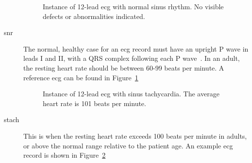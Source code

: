 \documentclass[\main/thesis.tex]{subfiles}
\begin{document}
\begin{description}
    \begin{figure}[ht]
        \centering
        \caption{Instance of 12-lead \gls{ecg} with normal sinus rhythm. No visible defects or abnormalities indicated.}
        \label{fig:full_SNR}
    \end{figure}
    \item[\gls{snr}] The normal, healthy case for an \gls{ecg} record must have an upright P wave in leads I and II, with a QRS complex following each P wave~\cite{meek_introduction_2002}. In an adult, the resting heart rate should be between 60-99 beats per minute.
    A reference \gls{ecg} can be found in Figure~\ref{fig:full_SNR}

    \begin{figure}[ht]
        \centering
        \caption{Instance of 12-lead \gls{ecg} with sinus tachycardia. The average heart rate is 101 beats per minute.}
        \label{fig:full_STach}
    \end{figure}
    \item[\gls{stach}] This is when the resting heart rate exceeds 100 beats per minute in adults, or above the normal range relative to the patient age.
    An example \gls{ecg} record is shown in Figure~\ref{fig:full_STach}


\end{description}
\end{document}
